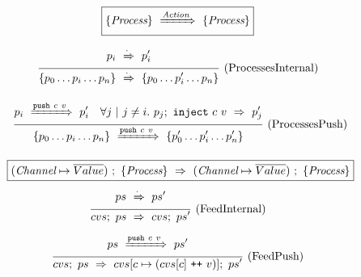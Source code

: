 
\begin{figure}

$$
  \boxed{\{ \textit{Process} \}~\xRightarrow{\textit{Action}}~\{ \textit{Process} \}}
$$

$$
\ruleIN{
  \ProcShake{p_i}{\cdot}{p'_i}
}{
  \ProcsShake{
    \sgl{p_0 \ldots p_i \ldots p_n}
  }{\cdot}{
    \sgl{p_0 \ldots p'_i \ldots p_n}
  }
}{ProcessesInternal}
$$

$$
\ruleIN{
  \ProcShake{p_i}{\Push~c~v}{p'_i}
  \quad
  \forall j~|~j \neq i.~
  \ProcInject{p_j}{c}{v}{p'_j}
}{
  \ProcsShake{
    \sgl{p_0 \ldots p_i \ldots p_n}
  }{\Push~c~v}{
    \sgl{p'_0 \ldots p'_i \ldots p'_n}
  }
}{ProcessesPush}
$$


\vspace{1em}

\newcommand\vs {\ti{vs}}
\newcommand\accs {\ti{accs}}
\newcommand\network {\ti{ps}}

$$
  \boxed{
    (\textit{Channel} \mapsto \overline{Value})~;~\{ \textit{Process} \}~\Rightarrow~(\textit{Channel} \mapsto \overline{Value})~;~\{ \textit{Process} \}
  }
$$
$$
\enskip \frac {\displaystyle 
  ps~\xRightarrow{\cdot}~ps'
} {\displaystyle 
  cvs;~ps~\Rightarrow~cvs;~ps'
} \  \mbox{(FeedInternal)} \enskip
$$








$$
\enskip \frac {\displaystyle 
  ps~\xRightarrow{\texttt{push}~c~v}~ps'
} {\displaystyle 
  cvs;~ps~\Rightarrow~cvs[c \mapsto (cvs[c] ~\texttt{++}~ v)];~ps'
} \  \mbox{(FeedPush)} \enskip
$$





\end{figure}
